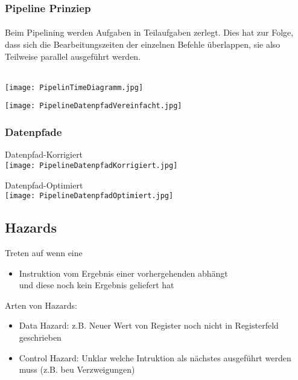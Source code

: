 		\subsubsection{Pipeline Prinziep}
			\paragraph{} Beim Pipelining werden Aufgaben in Teilaufgaben zerlegt.
			Dies hat zur Folge, dass sich die Bearbeitungszeiten der einzelnen Befehle
			überlappen, sie also Teilweise parallel ausgeführt werden. \\ \mbox{} \\
			\begin{minipage}{0.5\textwidth}
				\centerline{\texttt{[image: PipelinTimeDiagramm.jpg]}}
			\end{minipage}
			\begin{minipage}{0.45\textwidth}
				\centerline{\texttt{[image: PipelineDatenpfadVereinfacht.jpg]}}
			\end{minipage}

		\subsubsection{Datenpfade}
			\begin{minipage}{0.5\textwidth}
				\begin{center}
					Datenpfad-Korrigiert \\
					\texttt{[image: PipelineDatenpfadKorrigiert.jpg]}
				\end{center}
			\end{minipage}
			\begin{minipage}{0.45\textwidth}
				\begin{center}
					Datenpfad-Optimiert \\ 
					\texttt{[image: PipelineDatenpfadOptimiert.jpg]}
				\end{center}
			\end{minipage}


	\vspace{0.8cm}
	\subsection{Hazards}
		Treten auf wenn eine 
		\begin{itemize}
			\item Instruktion vom Ergebnis einer vorhergehenden abhängt \\
				und diese noch kein Ergebnis geliefert hat
		\end{itemize}
		Arten von Hazards:
		\begin{itemize}
			\item Data Hazard: z.B. Neuer Wert von Register noch nicht in Registerfeld geschrieben
			\item Control Hazard: Unklar welche Intruktion als nächstes ausgeführt werden muss (z.B. beu Verzweigungen)
		\end{itemize}


